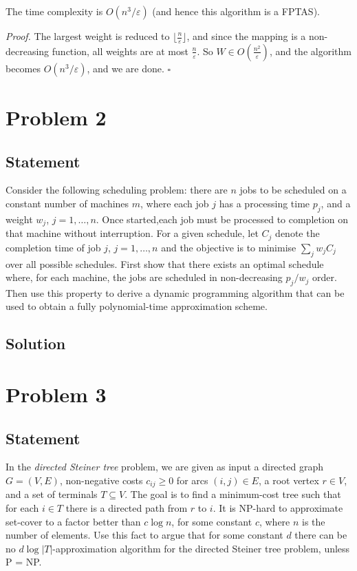 \documentclass[a4paper]{article}
\newenvironment{proof}{\begin{breakbox}\textit{Proof.}}{\hfill$\square$\end{breakbox}}
\newcommand{\eps}{\varepsilon}
\begin{document}
\begin{claim}
    The time complexity is $O(n^3 / \eps)$ (and hence this algorithm is a FPTAS).
\end{claim}
\begin{proof}
    The largest weight is reduced to $\lfloor\frac{n}{\eps}\rfloor$, and since the mapping is a non-decreasing function, all weights are at most $\frac{n}{\eps}$. So $W \in O(\frac{n^2}{\eps})$,
    and the algorithm becomes $O(n^3 / \eps)$, and we are done.
\end{proof}

\newpage

\section{Problem 2}
\subsection{Statement}
Consider the following scheduling problem: there are $n$ jobs to be scheduled on a constant number of machines $m$, where each job $j$ has a processing time $p_j$, and a weight $w_j$, $j = 1, \ldots, n$.
Once started,each job must be processed to completion on that machine without interruption. For a given schedule, let $C_j$ denote the completion time of job $j$, $j = 1, \ldots, n$ and the
objective is to minimise $\sum_j w_j C_j$ over all possible schedules. First show that there exists an optimal schedule where, for each machine, the jobs are scheduled in non-decreasing
$p_j/w_j$ order. Then use this property to derive a dynamic programming algorithm that can be used to obtain a fully polynomial-time approximation scheme.
\subsection{Solution}
\newpage

\section{Problem 3}
\subsection{Statement}
In the \emph{directed Steiner tree} problem, we are given as input a directed graph $G = (V, E)$, non-negative costs $c_{ij} \ge 0$ for arcs $(i, j) \in E$, a root vertex $r \in V$, and a set of
terminals $T \subseteq V$. The goal is to find a minimum-cost tree such that for each $i\in T$ there is a directed path from $r$ to $i$. It is NP-hard to approximate set-cover to a factor better than
$c\log n$, for some constant $c$, where $n$ is the number of elements. Use this fact to argue that for some constant $d$ there can be no $d \log |T|$-approximation algorithm for the directed Steiner tree problem, unless P = NP.
\end{document}
